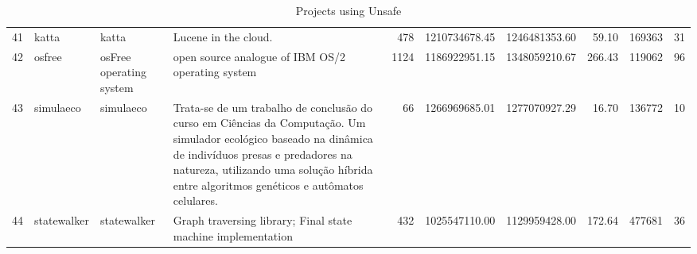 \begin{table}[ht]
\begin{tabular}{rlllrrrrrr}
  41 & katta & katta & Lucene in the cloud. & 478 & 1210734678.45 & 1246481353.60 & 59.10 & 169363 &  31 \\ 
  42 & osfree & osFree operating system & open source analogue of IBM OS/2 operating system & 1124 & 1186922951.15 & 1348059210.67 & 266.43 & 119062 &  96 \\ 
  43 & simulaeco & simulaeco & Trata-se de um trabalho de conclusão do curso em Ciências da Computação. Um simulador ecológico baseado na dinâmica de indivíduos presas e predadores na natureza, utilizando uma solução híbrida entre algoritmos genéticos e autômatos celulares. &  66 & 1266969685.01 & 1277070927.29 & 16.70 & 136772 &  10 \\ 
  44 & statewalker & statewalker & Graph traversing library; Final state machine implementation & 432 & 1025547110.00 & 1129959428.00 & 172.64 & 477681 &  36 \\ 
   \hline
\end{tabular}
\caption{Projects using Unsafe} 
\label{table:projects}
\end{table}
